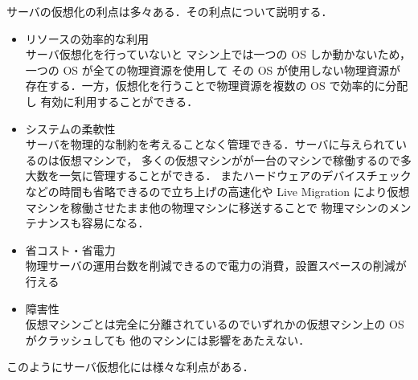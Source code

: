\documentclass[graduation-thesis]{mlarticle}
\begin{document}
サーバの仮想化の利点は多々ある．その利点について説明する．
\begin{itemize}
\item リソースの効率的な利用\\
     サーバ仮想化を行っていないと
マシン上では一つの OS しか動かないため，一つの OS が全ての物理資源を使用して
その OS が使用しない物理資源が存在する．一方，仮想化を行うことで物理資源を複数の OS で効率的に分配し
有効に利用することができる．
\item システムの柔軟性\\
     サーバを物理的な制約を考えることなく管理できる．サーバに与えられているのは仮想マシンで，
多くの仮想マシンがが一台のマシンで稼働するので多大数を一気に管理することができる．
またハードウェアのデバイスチェックなどの時間も省略できるので立ち上げの高速化や
Live Migration により仮想マシンを稼働させたまま他の物理マシンに移送することで
物理マシンのメンテナンスも容易になる．
\item 省コスト・省電力\\
     物理サーバの運用台数を削減できるので電力の消費，設置スペースの削減が行える
\item 障害性\\
     仮想マシンごとは完全に分離されているのでいずれかの仮想マシン上の OS がクラッシュしても
他のマシンには影響をあたえない．
\end{itemize}
このようにサーバ仮想化には様々な利点がある．
\end{document}
